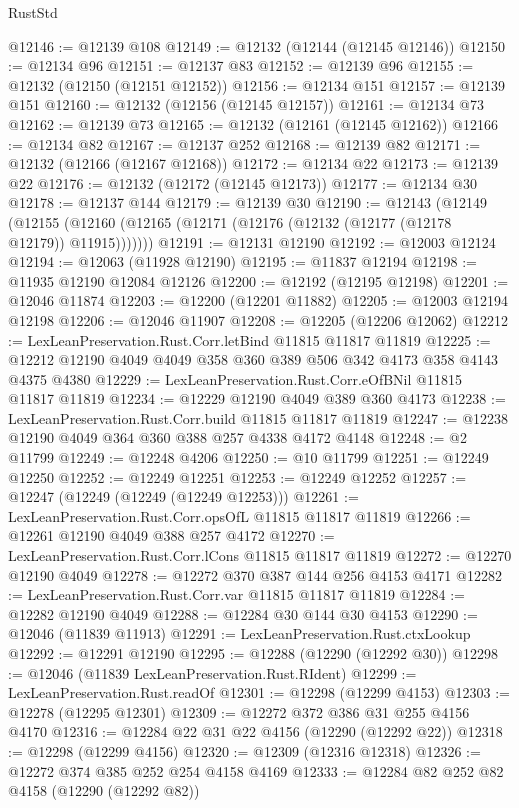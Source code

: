 \begin{lexlean}{RustStd}
\begin{coremodule}
@12146 := @12139 @108
@12149 := @12132 (@12144 (@12145 @12146))
@12150 := @12134 @96
@12151 := @12137 @83
@12152 := @12139 @96
@12155 := @12132 (@12150 (@12151 @12152))
@12156 := @12134 @151
@12157 := @12139 @151
@12160 := @12132 (@12156 (@12145 @12157))
@12161 := @12134 @73
@12162 := @12139 @73
@12165 := @12132 (@12161 (@12145 @12162))
@12166 := @12134 @82
@12167 := @12137 @252
@12168 := @12139 @82
@12171 := @12132 (@12166 (@12167 @12168))
@12172 := @12134 @22
@12173 := @12139 @22
@12176 := @12132 (@12172 (@12145 @12173))
@12177 := @12134 @30
@12178 := @12137 @144
@12179 := @12139 @30
@12190 := @12143
    (@12149 (@12155 (@12160 (@12165 (@12171 (@12176 (@12132 (@12177 (@12178 @12179)) @11915)))))))
@12191 := @12131 @12190
@12192 := @12003 @12124
@12194 := @12063 (@11928 @12190)
@12195 := @11837 @12194
@12198 := @11935 @12190 @12084 @12126
@12200 := @12192 (@12195 @12198)
@12201 := @12046 @11874
@12203 := @12200 (@12201 @11882)
@12205 := @12003 @12194 @12198
@12206 := @12046 @11907
@12208 := @12205 (@12206 @12062)
@12212 := LexLeanPreservation.Rust.Corr.letBind @11815 @11817 @11819
@12225 := @12212 @12190 @4049 @4049 @358 @360 @389 @506 @342 @4173 @358 @4143 @4375 @4380
@12229 := LexLeanPreservation.Rust.Corr.eOfBNil @11815 @11817 @11819
@12234 := @12229 @12190 @4049 @389 @360 @4173
@12238 := LexLeanPreservation.Rust.Corr.build @11815 @11817 @11819
@12247 := @12238 @12190 @4049 @364 @360 @388 @257 @4338 @4172 @4148
@12248 := @2 @11799
@12249 := @12248 @4206
@12250 := @10 @11799
@12251 := @12249 @12250
@12252 := @12249 @12251
@12253 := @12249 @12252
@12257 := @12247 (@12249 (@12249 (@12249 @12253)))
@12261 := LexLeanPreservation.Rust.Corr.opsOfL @11815 @11817 @11819
@12266 := @12261 @12190 @4049 @388 @257 @4172
@12270 := LexLeanPreservation.Rust.Corr.lCons @11815 @11817 @11819
@12272 := @12270 @12190 @4049
@12278 := @12272 @370 @387 @144 @256 @4153 @4171
@12282 := LexLeanPreservation.Rust.Corr.var @11815 @11817 @11819
@12284 := @12282 @12190 @4049
@12288 := @12284 @30 @144 @30 @4153
@12290 := @12046 (@11839 @11913)
@12291 := LexLeanPreservation.Rust.ctxLookup
@12292 := @12291 @12190
@12295 := @12288 (@12290 (@12292 @30))
@12298 := @12046 (@11839 LexLeanPreservation.Rust.RIdent)
@12299 := LexLeanPreservation.Rust.readOf
@12301 := @12298 (@12299 @4153)
@12303 := @12278 (@12295 @12301)
@12309 := @12272 @372 @386 @31 @255 @4156 @4170
@12316 := @12284 @22 @31 @22 @4156 (@12290 (@12292 @22))
@12318 := @12298 (@12299 @4156)
@12320 := @12309 (@12316 @12318)
@12326 := @12272 @374 @385 @252 @254 @4158 @4169
@12333 := @12284 @82 @252 @82 @4158 (@12290 (@12292 @82))

\end{coremodule}
\end{lexlean}

